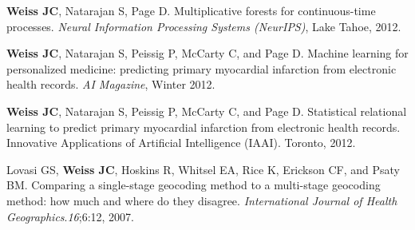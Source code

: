 \begin{bibsection}
\item  \textbf{Weiss JC}, Natarajan S, Page D. Multiplicative forests for continuous-time processes. \textit{Neural Information Processing Systems (NeurIPS)}, Lake Tahoe, 2012.

\item  \textbf{Weiss JC}, Natarajan S, Peissig P, McCarty C, and Page D. Machine learning for personalized medicine: predicting primary myocardial infarction from electronic health records. \textit{AI Magazine}, Winter 2012.

\item  \textbf{Weiss JC}, Natarajan S, Peissig P, McCarty C, and Page D. Statistical relational learning to predict primary myocardial infarction from electronic health records. Innovative Applications of Artificial Intelligence (IAAI). Toronto, 2012.

\item  Lovasi GS, \textbf{Weiss JC}, Hoskins R, Whitsel EA, Rice K, Erickson CF, and Psaty BM. Comparing a single-stage geocoding method to a multi-stage geocoding method: how much and where do they disagree. \textit{International Journal of Health Geographics}.\textit{16};6:12, 2007.
  
\end{bibsection}

